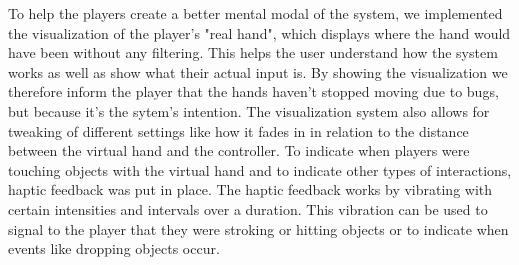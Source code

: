 
To help the players create a better mental modal of the system\parencite{Norman}, we implemented the visualization of the player's "real hand", which displays where the hand would have been without any filtering. This helps the user understand how the system works as well as show what their actual input is. By showing the visualization we therefore inform the player that the hands haven't stopped moving due to bugs, but because it's the sytem's intention. The visualization system also allows for tweaking of different settings like how it fades in in relation to the distance between the virtual hand and the controller. To indicate when players were touching objects with the virtual hand and to indicate other types of interactions, haptic feedback was put in place. The haptic feedback works by vibrating with certain intensities and intervals over a duration. This vibration can be used to signal to the player that they were stroking or hitting objects or to indicate when events like dropping objects occur.

